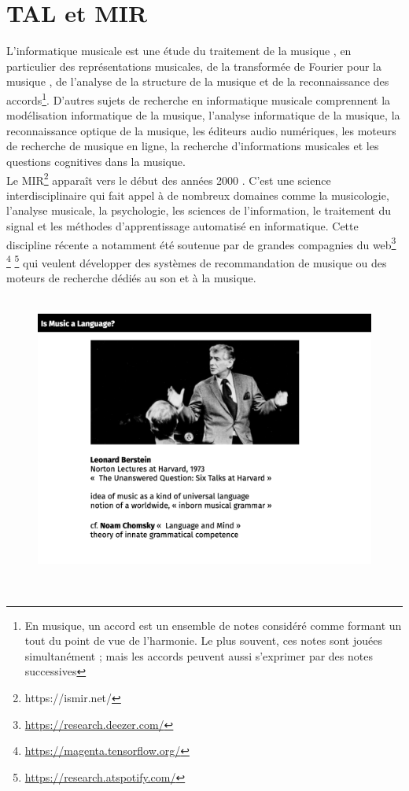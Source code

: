 \section{TAL et MIR}
L'informatique musicale \cite{mus_inf} est une étude du traitement de la
musique \cite{book_muller}, en particulier des représentations musicales, de la
transformée de Fourier pour la musique \cite{fourier}, de l'analyse de la
structure de la musique et de la reconnaissance des accords\footnote{En
musique, un accord est un ensemble de notes considéré comme formant un tout du
point de vue de l'harmonie. Le plus souvent, ces notes sont jouées
simultanément ; mais les accords peuvent aussi s'exprimer par des notes
successives}. D'autres sujets de recherche en informatique musicale comprennent
la modélisation informatique de la musique, l'analyse informatique de la
musique, la reconnaissance optique de la musique, les éditeurs audio
numériques, les moteurs de recherche de musique en ligne, la recherche
d'informations musicales et les questions cognitives dans la musique.\\
Le MIR\footnote{https://ismir.net/} apparaît vers le début des années 2000
\cite{MIR_1}. C’est une science interdisciplinaire qui fait appel à de nombreux
domaines comme la musicologie, l’analyse musicale, la psychologie, les sciences
de l’information, le traitement du signal et les méthodes d’apprentissage
automatisé en informatique. Cette discipline récente a notamment été soutenue
par de grandes compagnies du web\footnote{\url{https://research.deezer.com/}}
\footnote{\url{https://magenta.tensorflow.org/}}
\footnote{\url{https://research.atspotify.com/}} qui veulent développer des
systèmes de recommandation de musique ou des moteurs de recherche dédiés au son
et à la musique.\\\\
\begin{figure}[!h]
	\centering
	\includegraphics[height=85mm, width=120mm]{z_images/1_contexte/0_Bernstein.png}
\end{figure}\\
